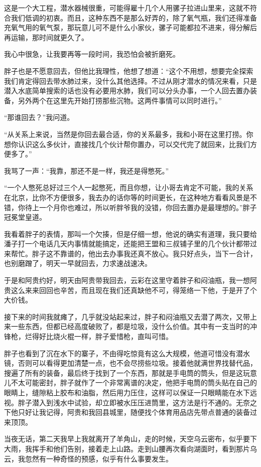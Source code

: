 这是一个大工程，潜水器械很重，可能得雇十几个人用骡子拉进山里来，这就不符合我们低调的初衷。而且，这种东西不是那么好弄的，除了氧气瓶，我们还得准备充氧气用的氧气泵，那玩意儿可不是什么小家伙，骡子可能都拉不进来，得分解后再运输，那时间就更久了。

我心中很急，让我要再等一段时间，我恐怕会被折磨死。

胖子也是不愿意回去，但他比我理性，他想了想道：“这个不用想，想要完全探索我们肯定得回去带水肺过来，没什么其他选择。不过从刚才潜水的情况来看，只是潜入水底简单搜索的话也没有必要用水肺，我们可以分头办事，一个人回去置办装备，另外两个在这里先开始打捞那些沉物。这两件事情可以同时进行。”

“那谁回去？”我问道。

“从关系上来说，当然是你回去最合适，你的关系最多，我和小哥在这里打捞。你想你认识这么多伙计，直接找几个伙计帮你置办，可以交代完了就回来，比我们方便多了。”

我骂了一声：“我靠，那还不是一样，我还是得憋死。”

“一个人憋死总好过三个人一起憋死，而且你想，让小哥去肯定不可能，我的关系在北京，比你不方便很多，我去办的话你等的时间更长，在这种地方看看风景是不错，你待上一个月你也难过，所以听胖爷我的没错，你回去置办是最理想的。”胖子冠冕堂皇道。

我看着胖子的表情，那叫一个欠揍，但是仔细一想，他说的确实有道理，我只要给潘子打一个电话几天内事情就能搞定，还能把王盟和三叔铺子里的几个伙计都带过来帮忙。胖子这不靠谱的，他出去办事我还真不放心。我只好点头，当下一合计，也别磨蹭了，明天一早就回去，力求速战速决。

于是和阿贵约好，明天由阿贵带我回去，云彩在这里守着胖子和闷油瓶，我一想阿贵这么来来回回也辛苦，而且现在我们还真缺他不可，得笼络一下他，于是开了个大价钱。

接下来的时间我就瘫了，几乎就没站起来过，胖子和闷油瓶又去潜了两次，又带上来一些东西，但都已经高度破败了，都是垃圾，没什么价值。其中有一支当时的冲锋枪，烂得好比烧火棍一样，胖子爱惜枪，直叫可惜。

胖子也看到了沉在水下的寨子，不由得吃惊竟有这么大规模，他道可惜没有潜水镜，否则可以看得更加清楚一点，也不会尽捞些垃圾。接着他就满世界找替代品，搜遍了所有的装备，最后终于找到了一个东西，那就是手电筒的筒头，但是这玩意儿不太可能密封，胖子就作了一个非常离谱的决定，他把手电筒的筒头贴在自己的眼睛上，缝隙粘上胶布和油脂，然后用力压住，这样可以保证一只眼睛能在水下远视。胖子潜入到浅水中试验，却立即被水压压进筒里，这方法是行不通的。无奈之下他只好让我记得，阿贵和我回县城里，随便找个体育用品店先带点普通的装备过来顶顶。

当夜无话，第二天我早上我就离开了羊角山，走的时候，天空乌云密布，似乎要下大雨，我挥手和他们告别，接着走上山路。走到山腰再次看向湖面时，看到那片乌云，我忽然有一种奇怪的预感，似乎有什么事要发生。

